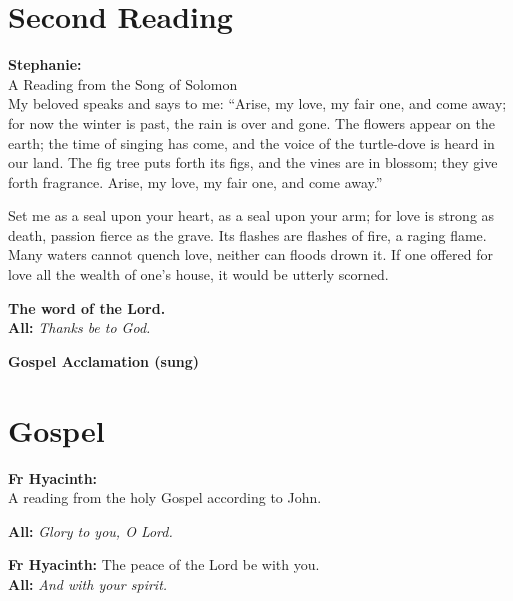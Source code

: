 \documentclass[12pt,landscape]{article}
\begin{document}
\newpage
\begin{multicols}{2}

\section*{Second Reading}

\textbf{Stephanie:}\\
A Reading from the Song of Solomon\\
My beloved speaks and says to me: “Arise, my love, my fair one, and come away; for now the winter is past, the rain is over and gone. The flowers appear on the earth; the time of singing has come, and the voice of the turtle-dove is heard in our land. The fig tree puts forth its figs, and the vines are in blossom; they give forth fragrance. Arise, my love, my fair one, and come away.” 

Set me as a seal upon your heart, as a seal upon your arm; for love is strong as death, passion fierce as the grave. Its flashes are flashes of fire, a raging flame. Many waters cannot quench love, neither can floods drown it. If one offered for love all the wealth of one’s house, it would be utterly scorned.

\textbf{The word of the Lord.}\\
\textbf{All:} \textit{Thanks be to God.}

\vspace{1em}

\textbf{Gospel Acclamation (sung)}

\columnbreak

\section*{Gospel}

\textbf{Fr Hyacinth:}\\
A reading from the holy Gospel according to John.

\textbf{All:} \textit{Glory to you, O Lord.}

\vspace{1em}

\textbf{Fr Hyacinth:} The peace of the Lord be with you.\\
\textbf{All:} \textit{And with your spirit.}

\vspace{0.5em}


\end{multicols}
\end{document}
